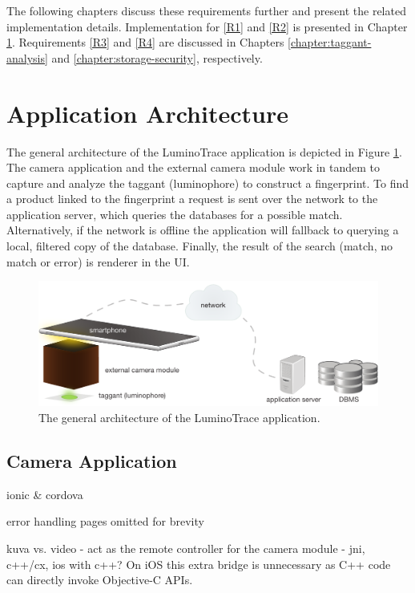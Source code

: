 \documentclass[thesis.tex]{subfiles}
\begin{document}
\noindent The following chapters discuss these requirements further and present the related implementation details. Implementation for \ref{R1} and \ref{R2} is presented in Chapter \ref{chapter:application-architecture}. Requirements \ref{R3} and \ref{R4} are discussed in Chapters \ref{chapter:taggant-analysis} and \ref{chapter:storage-security}, respectively.

\section{Application Architecture}
\label{chapter:application-architecture}

The general architecture of the LuminoTrace application is depicted in Figure \ref{figure:architecture}. The camera application and the external camera module work in tandem to capture and analyze the taggant (luminophore) to construct a fingerprint. To find a product linked to the fingerprint a request is sent over the network to the application server, which queries the databases for a possible match. Alternatively, if the network is offline the application will fallback to querying a local, filtered copy of the database. Finally, the result of the search (match, no match or error) is renderer in the UI.

\begin{figure}[h]
\centering \includegraphics[width=13.5cm]{images/design_implementation/architecture}
\caption{The general architecture of the LuminoTrace application. \label{figure:architecture}}
\end{figure}

\subsection{Camera Application}
\label{chapter:camera-application}
ionic \& cordova

error handling pages omitted for brevity

kuva vs. video
- act as the remote controller for the camera module
- jni, c++/cx, ios with c++?
On iOS this extra bridge is unnecessary as C++ code can directly invoke Objective-C APIs.
\end{document}
